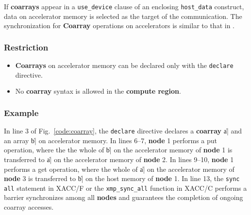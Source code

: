 If {\bf coarrays} appear in a {\tt use\_device} clause of an enclosing
{\tt host\_data} construct, 
data on accelerator memory is selected as the target of the communication.
%
The synchronization for {\bf Coarray} operations on accelerators is
similar to that in {\XMP}.

\subsubsection*{Restriction}

\begin{itemize}
 \item {\bf Coarrays} on accelerator memory can be declared only with
	   the {\tt declare} directive.
 \item No {\bf coarray} syntax is allowed in the {\OACC} {\bf compute
	   region}.
\end{itemize}

\subsubsection*{Example}

In line 3 of Fig.~\ref{code:coarray},
the {\tt declare} directive declares a {\bf coarray} \|a| and an
array \|b| on accelerator memory.
%
In lines 6--7,
{\bf node} 1 performs a put operation, where
the the whole of \|b| on the accelerator memory of {\bf node} 1 is
transferred to \|a| on the accelerator memory of
{\bf node} 2. 
%
In lines 9--10,
{\bf node} 1 performs a get operation, where
the whole of \|a| on the accelerator memory of {\bf node} 3 is
transferred to \|b| on the host memory of {\bf node} 1.
%
In line 13,
the {\tt sync all} statement in XACC/F or the {\tt xmp\_sync\_all}
function in XACC/C performs a barrier synchronizes among all {\bf nodes}
and guarantees the completion of ongoing coarray accesses.

